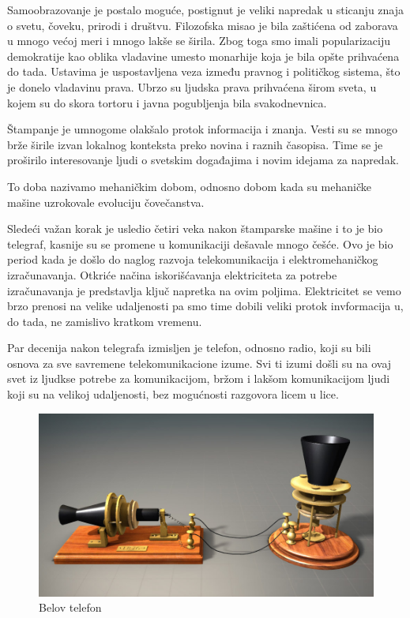 \documentclass[10pt]{article}
\begin{document}
	Samoobrazovanje je postalo moguće, postignut je veliki napredak u sticanju znaja o svetu, čoveku, prirodi i društvu. Filozofska misao je bila zaštićena od zaborava u mnogo većoj meri i mnogo lakše se širila. Zbog toga smo imali popularizaciju demokratije kao oblika vladavine umesto monarhije koja je bila opšte prihvaćena do tada. Ustavima je uspostavljena veza između pravnog i političkog sistema, što je donelo vladavinu prava. Ubrzo su ljudska prava prihvaćena širom sveta, u kojem su do skora tortoru i javna pogubljenja bila svakodnevnica. 
	
	Štampanje je umnogome olakšalo protok informacija i znanja. Vesti su se mnogo brže širile izvan lokalnog konteksta preko novina i raznih časopisa. Time se je proširilo interesovanje ljudi o svetskim događajima i novim idejama za napredak.

	To doba nazivamo mehaničkim dobom, odnosno dobom kada su mehaničke mašine uzrokovale evoluciju čovečanstva.

	Sledeći važan korak je usledio četiri veka nakon štamparske mašine i to je bio telegraf, kasnije su se promene u komunikaciji dešavale mnogo češće. Ovo je bio period kada je došlo do naglog razvoja telekomunikacija i elektromehaničkog izračunavanja. Otkriće načina iskorišćavanja elektriciteta za potrebe izračunavanja je predstavlja ključ napretka na ovim poljima. Elektricitet se vemo brzo prenosi na velike udaljenosti pa smo time dobili veliki protok invformacija u, do tada, ne zamislivo kratkom vremenu.
	
	Par decenija nakon telegrafa izmisljen je telefon, odnosno radio, koji  su bili osnova za sve savremene telekomunikacione izume. Svi ti izumi došli su na ovaj svet iz ljudkse potrebe za komunikacijom, bržom i lakšom komunikacijom ljudi koji su na velikoj udaljenosti, bez mogućnosti razgovora licem u lice. 

	
\begin{figure}
    \centering
    \includegraphics[scale=0.4]{telefon.jpg}
    \caption{Belov telefon}
\end{figure}
\end{document}
